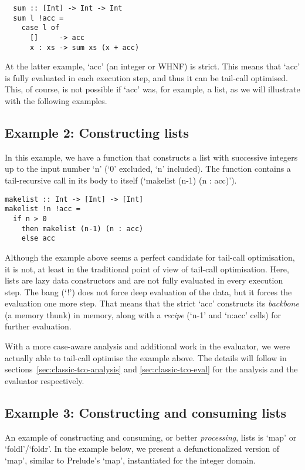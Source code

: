 \documentclass[diploma]{softlab-thesis}
\begin{document}
\begin{verbatim}
  sum :: [Int] -> Int -> Int
  sum l !acc = 
    case l of 
      []     -> acc 
      x : xs -> sum xs (x + acc) 
\end{verbatim}

At the latter example, `acc' (an integer or WHNF) is strict. This means that `acc' is 
fully evaluated in each execution step, and thus it can be tail-call optimised. This, of course,
is not possible if `acc' was, for example, a list, as we will illustrate with the following examples.


\subsection {Example 2: Constructing lists}
\label{sec:example2}

In this example, we have a function that constructs a list with successive 
integers up to the input number `n' (`0' excluded, `n' included). The function contains 
a tail-recursive call in its body to itself (`makelist (n-1) (n : acc)'). 

\begin{verbatim}
makelist :: Int -> [Int] -> [Int]
makelist !n !acc = 
  if n > 0 
    then makelist (n-1) (n : acc)
    else acc
\end{verbatim}

Although the example above seems a perfect candidate for tail-call optimisation, it is not, 
at least in the traditional point of view of tail-call optimisation. Here, lists are 
lazy data constructors and are not fully evaluated in every execution step. The bang (`!') does not 
force deep evaluation of the data, but it forces the evaluation one more step. That means that the strict 
`acc' constructs its \textit{backbone} (a memory thunk) in memory, along with a \textit{recipe} 
(`n-1' and `n:acc' cells) for further evaluation. 

With a more case-aware analysis and additional work in the evaluator, 
we were actually able to tail-call optimise the example
above. The details will follow in sections~\ref{sec:classic-tco-analysis} and \ref{sec:classic-tco-eval} for the analysis 
and the evaluator respectively.

\subsection {Example 3: Constructing and consuming lists}
\label{sec:example3}

An example of constructing and consuming, or better \textit{processing}, lists is `map' or `foldl'/`foldr'.
In the example below, we present a defunctionalized version of `map', similar to Prelude's `map', instantiated for
the integer domain.
\end{document}
